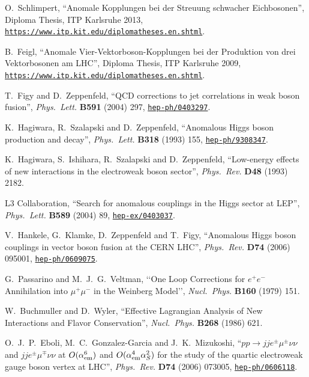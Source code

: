 \documentclass[english,12pt]{article}
\begin{document}
\begin{thebibliography}{10}
O.~Schlimpert, ``Anomale Kopplungen bei der Streuung schwacher
Eichbosonen'', {Diploma Thesis, ITP Karlsruhe 2013}, 
\href{https://www.itp.kit.edu/diplomatheses.en.shtml}{{\tt https://www.itp.kit.edu/diplomatheses.en.shtml}}.

B.~Feigl, ``Anomale Vier-Vektorboson-Kopplungen bei der Produktion von drei 
    Vektorbosonen am LHC'', {Diploma Thesis, ITP Karlsruhe 2009}, 
\href{https://www.itp.kit.edu/diplomatheses.en.shtml}{{\tt https://www.itp.kit.edu/diplomatheses.en.shtml}}.

T.~Figy and D.~Zeppenfeld, ``{QCD corrections to jet correlations in weak boson
  fusion}'', {\em Phys.\ Lett.} {\bf B591} (2004) 297,
\href{https://www.arXiv.org/abs/hep-ph/0403297}{{\tt hep-ph/0403297}}.

K.~Hagiwara, R.~Szalapski and D.~Zeppenfeld, ``{Anomalous Higgs boson
  production and decay}'', {\em Phys.\ Lett.} {\bf B318} (1993) 155,
\href{https://www.arXiv.org/abs/hep-ph/9308347}{{\tt hep-ph/9308347}}.

K.~Hagiwara, S.~Ishihara, R.~Szalapski and D.~Zeppenfeld, ``{Low-energy effects
  of new interactions in the electroweak boson sector}'', {\em Phys.\ Rev.} {\bf
  D48} (1993) 2182.

{L3} Collaboration, ``{Search for anomalous couplings in
  the Higgs sector at LEP}'', {\em Phys.\ Lett.} {\bf B589} (2004) 89,
\href{https://www.arXiv.org/abs/hep-ex/0403037}{{\tt hep-ex/0403037}}.

V.~Hankele, G.~Klamke, D.~Zeppenfeld and T.~Figy, ``{Anomalous Higgs boson
  couplings in vector boson fusion at the CERN LHC}'', {\em Phys.\ Rev.} {\bf
  D74} (2006) 095001,
\href{https://www.arXiv.org/abs/hep-ph/0609075}{{\tt hep-ph/0609075}}.

  G.~Passarino and M.~J.~G.~Veltman,
  `{`One Loop Corrections for $e^+e^-$ Annihilation into $\mu^+\mu^-$ in the Weinberg
  Model}'',
  {\em Nucl.\ Phys.}  {\bf B160} (1979) 151.

W.~Buchmuller and D.~Wyler, ``{Effective Lagrangian Analysis of New Interactions
  and Flavor Conservation}'', {\em Nucl.\ Phys.} {\bf B268} (1986)
621.

O.~J.~P.~Eboli, M.~C.~Gonzalez-Garcia and J.~K.~Mizukoshi, 
                  ``{$p p \to j j e^\pm \mu^\pm \nu \nu$ and $j j e^\pm \mu^\mp \nu \nu$ at
                  $O(\alpha_{\rm em}^6)$ and $O(\alpha_{\rm em}^4 \alpha_S^2)$ for the
                  study of the quartic electroweak gauge boson vertex at
                  LHC}'', {\em Phys.\ Rev.} {\bf D74} (2006) 073005,
\href{https://www.arXiv.org/abs/hep-ph/0606118}{{\tt hep-ph/0606118}}.


\end{thebibliography}
\end{document}
